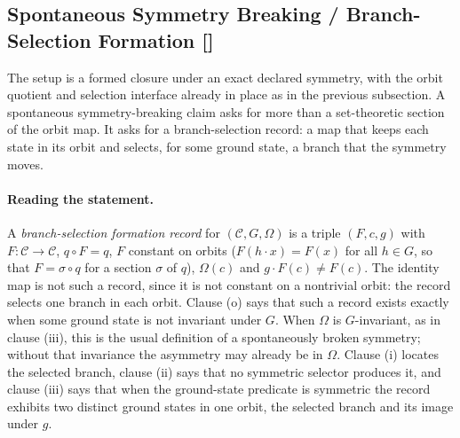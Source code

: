 \subsection{Spontaneous Symmetry Breaking / Branch-Selection Formation [\texorpdfstring{}{F15b}]}\label{sec:symmetry:spontaneous-ssb}

The setup is a formed closure under an exact declared symmetry, with
the orbit quotient and selection interface already in place as in the
previous subsection.  A spontaneous symmetry-breaking claim asks for
more than a set-theoretic section of the orbit map.  It asks for a
branch-selection record: a map that keeps each state in its orbit and
selects, for some ground state, a branch that the symmetry moves.

\paragraph{Reading the statement.}
A \emph{branch-selection formation record} for \((\mathcal C,G,\Omega)\) is a
triple \((F,c,g)\) with \(F:\mathcal C\to\mathcal C\), \(q\circ F=q\), \(F\)
constant on orbits (\(F(h\cdot x)=F(x)\) for all \(h\in G\), so that
\(F=\sigma\circ q\) for a section \(\sigma\) of \(q\)), \(\Omega(c)\) and
\(g\cdot F(c)\ne F(c)\). The identity map is not such a record, since it is not
constant on a nontrivial orbit: the record selects one branch in each orbit. Clause (o) says that such a record
exists exactly when some ground state is not invariant under \(G\). When
\(\Omega\) is \(G\)-invariant, as in clause (iii), this is the usual definition
of a spontaneously broken symmetry; without that invariance the asymmetry may
already be in \(\Omega\). Clause (i) locates
the selected branch, clause (ii) says that no symmetric selector
produces it, and clause (iii) says that when the ground-state predicate is
symmetric the record exhibits two distinct ground states in one orbit, the
selected branch and its image under \(g\).


